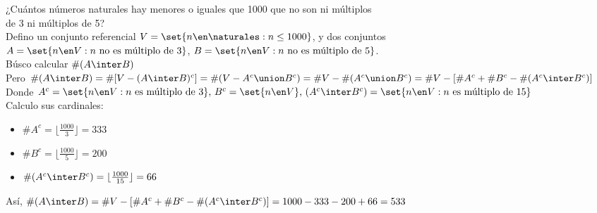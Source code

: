 \ejercicio

¿Cuántos números naturales hay menores o iguales que 1000 que no son ni múltiplos\\
de 3 ni múltiplos de 5?\\

Defino un conjunto referencial $V = \set{n \en \naturales : n \leq 1000}$, y dos conjuntos\\
$A = \set{n \en V : n \text{ no es múltiplo de } 3}$, $B = \set{n \en V : n \text{ no es múltiplo de } 5}$.\\

Búsco calcular $\#(A \inter B)$\\

Pero $
    \#(A \inter B) = \#[V - (A \inter B)^c] = \#(V - A^c \union B^c) = \#V - \#(A^c \union B^c) = \#V - [\#A^c + \#B^c - \#(A^c \inter B^c)]
$\\
Donde 
$
    A^c = \set{n \en V : n \text{ es múltiplo de } 3} \text{, }
    B^c = \set{n \en V} \text{, }
    (A^c \inter B^c) = \set{n \en V : n \text{ es múltiplo de } 15}
$\\

Calculo sus cardinales:

\begin{itemize}
    \item $\#A^c = \lfloor \frac{1000}{3} \rfloor = 333$
    \item $\#B^c = \lfloor \frac{1000}{5} \rfloor = 200$
    \item $\#(A^c \inter B^c) = \lfloor \frac{1000}{15} \rfloor = 66$
\end{itemize}

Así, $\#(A \inter B) = \#V - [\#A^c + \#B^c - \#(A^c \inter B^c)] = 1000 - 333 - 200 + 66 = 533$